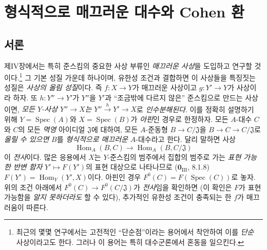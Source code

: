 \section{형식적으로 매끄러운 대수와 Cohen 환}
\label{section:0.19-fr}
\label{0.19-fr}

\setcounter{subsection}{-1}
\subsection{서론}
\label{subsection:0.19.0-fr}
\label{0.19.0-fr}


\begin{env}[19.0.1]
\label{0.19.0.1-fr}
제IV장에서는 특히 준스킴의 중요한 사상 부류인 \emph{매끄러운 사상}을
도입하고 연구할 것이다.\footnote{최근의 몇몇 연구에서는 고전적인
``단순점''이라는 용어에서 착안하여 이를 \emph{단순} 사상이라고도
한다. 그러나 이 용어는 특히 대수군론에서 혼동을 일으킨다.}
그 기본 성질 가운데 하나이며, 유한성 조건과 결합하면 이 사상들을
특징짓는 성질은 \emph{사상의 올림 성질}이다. 즉 $f:X\to Y$가
매끄러운 사상이고 $g:Y'\to Y$가 사상이라 하자. 또
$h:Y''\to Y'$가 $Y''$을 $Y'$과 ``조금밖에 다르지 않은'' 준스킴으로
만드는 사상이면, \emph{모든 $Y$-사상 $Y''\to X$는}
$Y''\xrightarrow{h}Y'\to X$로 \emph{인수분해된다}. 이를 정확히
설명하기 위해 $Y=\operatorname{Spec}(A)$와
$X=\operatorname{Spec}(B)$가 \emph{아핀}인 경우로 한정하자.
모든 $A$-대수 $C$와 $C$의 모든 \emph{멱영} 아이디얼
$\mathfrak J$에 대하여, 모든 $A$-준동형 $B\to C/\mathfrak J$을
$B\to C\to C/\mathfrak J$로 \emph{올릴 수 있으면} $B$를
\emph{형식적으로 매끄러운} $A$-대수라고 한다. 달리 말하면 사상
\[
  \operatorname{Hom}_A(B,C)\longrightarrow
  \operatorname{Hom}_A(B,C/\mathfrak J)
\]
이 \emph{전사}이다. 많은 응용에서 $X$는 $Y$-준스킴의 범주에서
집합의 범주로 가는 \emph{표현 가능한 반변 함자}
$Y'\mapsto F(Y')$의 표현 대상으로 나타나므로
($\mathbf{0}_{\mathrm{III}}$, 8.1.8)
$F(Y')=\operatorname{Hom}_Y(Y',X)$이다. 아핀인 경우
$F^0(C)=F(\operatorname{Spec}(C))$로 놓자. 위의 조건 아래에서
$F^0(C)\to F^0(C/\mathfrak J)$가 \emph{전사}임을 확인하면
(이 확인은 $F$가 표현 가능함을 \emph{알지 못하더라도} 할 수 있다),
추가적인 유한성 조건이 충족되는 한 $f$가 매끄러움이 따른다.
\end{env}

